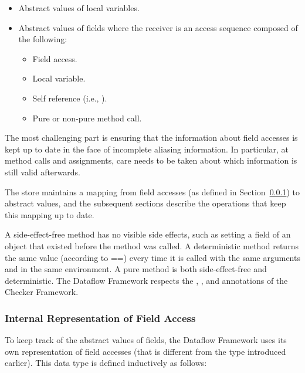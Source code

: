 \begin{itemize}
    \item Abstract values of local variables.
    \item Abstract values of fields where the receiver is an
          access sequence composed of the following:
    \begin{itemize}
    \item Field access.
    \item Local variable.
    \item Self reference (i.e., ).
    \item Pure or non-pure method call.
    \end{itemize}
\end{itemize}

The most challenging part is ensuring that the information about field
accesses is kept up to date in the face of incomplete aliasing
information.  In particular, at method calls and assignments, care
needs to be taken about which information is still valid afterwards.

The store maintains a mapping from field accesses (as defined in
Section~\ref{sec:field-access}) to abstract values, and the subsequent
sections describe the operations that keep this mapping up to date.

A side-effect-free method has no visible side effects, such
as setting a field of an object that existed before the method was called.
A deterministic method returns the same value (according to ==) every time
it is called with the same arguments and in the same environment.
A pure method is both side-effect-free and deterministic.
The Dataflow Framework respects the
\href{https://checkerframework.org/api/org/checkerframework/dataflow/qual/SideEffectFree.html}{},
\href{https://checkerframework.org/api/org/checkerframework/dataflow/qual/Deterministic.html}{}, and
\href{https://checkerframework.org/api/org/checkerframework/dataflow/qual/Pure.html}{}
annotations of the Checker Framework.


\subsubsection{Internal Representation of Field Access}
\label{sec:field-access}

To keep track of the abstract values of fields, the Dataflow Framework
uses its own representation of field accesses (that is different from
the  type introduced earlier).  This data type is defined
inductively as follows:

